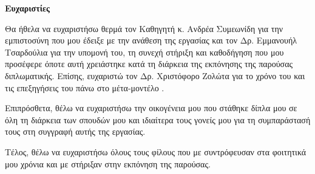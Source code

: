 \begin{center}
    \textbf{\Large{Ευχαριστίες}}
\end{center}

Θα ήθελα να ευχαριστήσω θερμά τον Kαθηγητή κ. Ανδρέα Συμεωνίδη για την εμπιστοσύνη που μου έδειξε με την ανάθεση της εργασίας
και τον Δρ. Εμμανουήλ Τσαρδούλια για την υπομονή του, τη συνεχή στήριξη και καθοδήγηση που μου προσέφερε όποτε αυτή χρειάστηκε κατά τη διάρκεια της εκπόνησης της παρούσας διπλωματικής.
Επίσης, ευχαριστώ τον Δρ. Χριστόφορο Ζολώτα για το χρόνο του και τις επεξηγήσεις του πάνω στο μέτα-μοντέλο \metamodel{}.

Επιπρόσθετα, θέλω να ευχαριστήσω την οικογένεια μου που στάθηκε δίπλα μου σε όλη τη διάρκεια των σπουδών μου και ιδιαίτερα τους γονείς μου για τη συμπαράστασή τους στη συγγραφή αυτής της εργασίας.

Τέλος, θέλω να ευχαριστήσω όλους τους φίλους που με συντρόφευσαν στα φοιτητικά μου χρόνια και με στήριξαν στην εκπόνηση της παρούσας.

